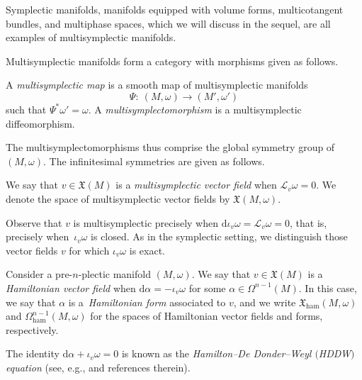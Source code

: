 \documentclass[pdftex]{sigma}
\numberwithin{equation}{section}
\newcommand{\ham}{\text{ham}}
\renewcommand{\L}{\mathscr{L}}
\newcommand{\X}{\mathfrak{X}}
\renewcommand{\d}{\mathrm{d}}
\begin{document}
Symplectic manifolds, manifolds equipped with volume forms, multicotangent bundles, and multiphase spaces, which we will discuss in the sequel, are all examples of multisymplectic manifolds.

Multisymplectic manifolds form a category with morphisms given as follows.

\begin{Definition}
	A \emph{multisymplectic map} is a smooth map of multisymplectic manifolds
\[
\Psi\colon \ (M,\omega) \to (M',\omega')
\]
 such that $\Psi^* \omega' = \omega$. A \emph{multisymplectomorphism} is a multisymplectic diffeomorphism.
\end{Definition}

The multisymplectomorphisms thus comprise the global symmetry group of $(M,\omega)$. The infinitesimal symmetries are given as follows.

\begin{Definition}\label{def:multisymplectic_vector_field}
	We say that $v\in\X(M)$ is a \emph{multisymplectic vector field} when $\L_v\omega = 0$. We denote the space of multisymplectic vector fields by $\X(M,\omega)$.
\end{Definition}

Observe that $v$ is multisymplectic precisely when $\d\iota_v\omega=\L_v\omega=0$, that is, precisely when~$\iota_v\omega$ is closed. As in the symplectic setting, we distinguish those vector fields $v$ for which $\iota_v\omega$ is exact.

\begin{Definition}\label{def:multisymplectic_Hamiltonian_vector_field}
	Consider a pre-$n$-plectic manifold $(M,\omega)$. We say that $v\in\X(M)$ is a \emph{Hamiltonian vector field} when $\d\alpha=-\iota_v\omega$ for some $\alpha\in\Omega^{n-1}(M)$. In this case, we say that $\alpha$ is a~\emph{Hamiltonian form} associated to $v$, and we write $\X_\ham(M,\omega)$ and $\Omega_\ham^{n-1}(M,\omega)$ for the spaces of Hamiltonian vector fields and forms, respectively.
\end{Definition}

\begin{Remark}
	The identity $\d\alpha +\iota_v\omega=0$ is known as the \emph{Hamilton--De Donder--Weyl $($HDDW$)$ equation} (see, e.g., \cite{Helein04,RyvkinWurzbacher18} and references therein).
\end{Remark}
\end{document}
